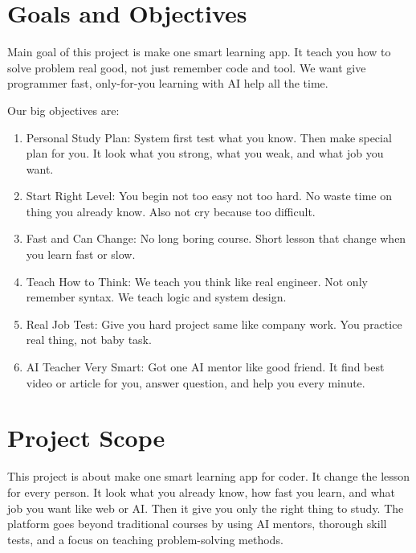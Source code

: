 \documentclass{FastFyp}
\begin{document}
\section{Goals and Objectives}

Main goal of this project is make one smart learning app. It teach you how to solve problem real good, not just remember code and tool. We want give programmer fast, only-for-you learning with AI help all the time.

Our big objectives are:

\begin{enumerate}
    \item Personal Study Plan: System first test what you know. Then make special plan for you. It look what you strong, what you weak, and what job you want.

    \item Start Right Level: You begin not too easy not too hard. No waste time on thing you already know. Also not cry because too difficult.

    \item Fast and Can Change: No long boring course. Short lesson that change when you learn fast or slow.

    \item Teach How to Think: We teach you think like real engineer. Not only remember syntax. We teach logic and system design.

    \item Real Job Test: Give you hard project same like company work. You practice real thing, not baby task.

    \item AI Teacher Very Smart: Got one AI mentor like good friend. It find best video or article for you, answer question, and help you every minute.
\end{enumerate}

\section{Project Scope}
This project is about make one smart learning app for coder. It change the lesson for every person. It look what you already know, how fast you learn, and what job you want like web or AI. Then it give you only the right thing to study. The platform goes beyond traditional courses by using AI mentors, thorough skill tests, and a focus on teaching problem-solving methods.
\end{document}
